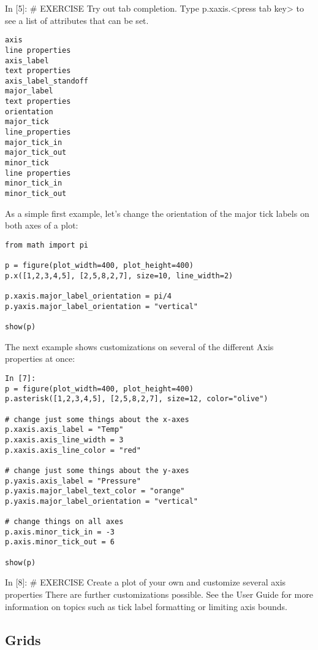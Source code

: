 In [5]:
# EXERCISE Try out tab completion. Type p.xaxis.<press tab key> to see a list of attributes that can be set.
\begin{framed}
\begin{verbatim}
axis
line properties
axis_label
text properties
axis_label_standoff
major_label
text properties
orientation
major_tick
line_properties
major_tick_in
major_tick_out
minor_tick
line properties
minor_tick_in
minor_tick_out
\end{verbatim}
\end{framed}
As a simple first example, let's change the orientation of the major tick labels on both axes of a plot:
\begin{framed}
	\begin{verbatim}
from math import pi

p = figure(plot_width=400, plot_height=400)
p.x([1,2,3,4,5], [2,5,8,2,7], size=10, line_width=2)

p.xaxis.major_label_orientation = pi/4
p.yaxis.major_label_orientation = "vertical"

show(p)
\end{verbatim}
\end{framed}
The next example shows customizations on several of the different Axis properties at once:
\begin{framed}
	\begin{verbatim}
In [7]:
p = figure(plot_width=400, plot_height=400)
p.asterisk([1,2,3,4,5], [2,5,8,2,7], size=12, color="olive")

# change just some things about the x-axes
p.xaxis.axis_label = "Temp"
p.xaxis.axis_line_width = 3
p.xaxis.axis_line_color = "red"

# change just some things about the y-axes
p.yaxis.axis_label = "Pressure"
p.yaxis.major_label_text_color = "orange"
p.yaxis.major_label_orientation = "vertical"

# change things on all axes
p.axis.minor_tick_in = -3
p.axis.minor_tick_out = 6

show(p)
\end{verbatim}
\end{framed}	
In [8]:
# EXERCISE Create a plot of your own and customize several axis properties
There are further customizations possible. See the User Guide for more information on topics such as tick label formatting or limiting axis bounds.

\subsection{Grids}

